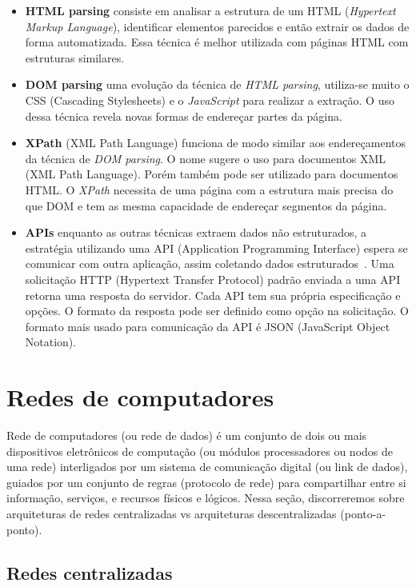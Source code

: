 \begin{itemize}
    \item \textbf{HTML parsing} consiste em analisar a estrutura de um HTML (\textit{Hypertext Markup Language}), identificar elementos parecidos e então extrair os dados de forma automatizada. 
    Essa técnica é melhor utilizada com páginas HTML com estruturas similares.
    \item \textbf{DOM parsing} uma evolução da técnica de \textit{HTML parsing}, utiliza-se muito o CSS (Cascading Stylesheets) e o \textit{JavaScript} para  realizar a extração. O uso dessa técnica revela novas formas de endereçar partes da página.
    \item \textbf{XPath} (XML Path Language) funciona de modo similar aos endereçamentos da técnica de \textit{DOM parsing}.
    O nome sugere o uso para documentos XML (XML Path Language).
    Porém também pode ser utilizado para documentos HTML.
    O \textit{XPath} necessita de uma página com a estrutura mais precisa do que DOM e tem as mesma capacidade de endereçar segmentos da página.
    \item \textbf{APIs} enquanto as outras técnicas extraem dados não estruturados, a estratégia utilizando uma API (Application Programming Interface) espera se comunicar com outra aplicação, assim coletando dados estruturados~\cite{Scraping2}.
    Uma solicitação HTTP (Hypertext Transfer Protocol) padrão enviada a uma API retorna uma resposta do servidor.
    Cada API tem sua própria especificação e opções.
    O formato da resposta pode ser definido como opção na solicitação.
    O formato mais usado para comunicação da API é JSON (JavaScript Object Notation).
\end{itemize}

\section{Redes de computadores}

Rede de computadores (ou rede de dados) é um conjunto de dois ou mais dispositivos eletrônicos de computação (ou módulos processadores ou nodos de uma rede) interligados por um sistema de comunicação digital (ou link de dados), guiados por um conjunto de regras (protocolo de rede) para compartilhar entre si informação, serviços, e recursos físicos e lógicos.
Nessa seção, discorreremos sobre arquiteturas de redes centralizadas vs arquiteturas descentralizadas (ponto-a-ponto).

\subsection{Redes centralizadas}

